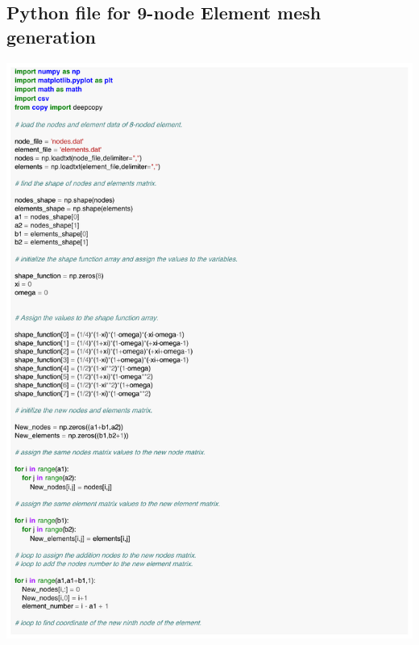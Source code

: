 \documentclass[12pt]{article}
\begin{document}
\begin{appendices}
\section{Python file for 9-node Element mesh generation}
\includegraphics[scale=0.80,page=1]{9Node_Mesh_generation.pdf}
\newpage

\end{appendices}
\end{document}
